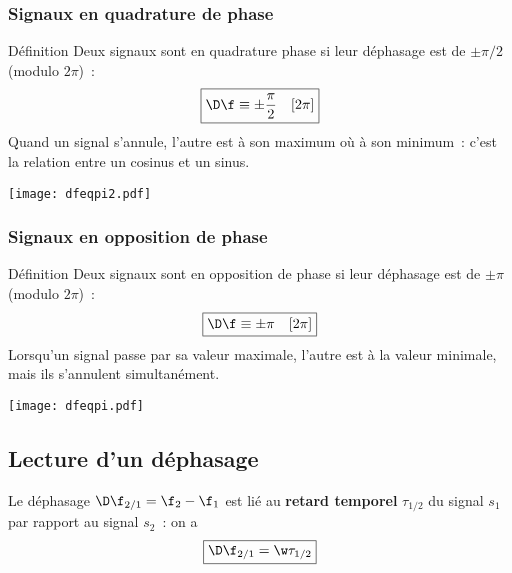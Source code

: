 \documentclass[../main/main.tex]{subfiles}
\begin{document}
\vspace{-20pt}
\subsubsection{Signaux en quadrature de phase}

\begin{minipage}{0.70\linewidth}
    \begin{rdefi}{\small Définition}
        Deux signaux sont en quadrature phase si leur déphasage est de
        $\pm\pi/2$ (modulo $2\pi$)~:
        \[\boxed{\D\f \equiv \pm\frac{\pi}{2} \quad[2\pi]}\]
        Quand un signal s'annule, l'autre est à son maximum où à son minimum~:
        c'est la relation entre un cosinus et un sinus.
    \end{rdefi}
\end{minipage}
\hfill
\begin{minipage}{0.30\linewidth}
    \begin{center}
        \texttt{[image: dfeqpi2.pdf]}
    \end{center}
\end{minipage}

\vspace{-20pt}
\subsubsection{Signaux en opposition de phase}

\begin{minipage}{0.70\linewidth}
    \begin{rdefi}{\small Définition}
        Deux signaux sont en opposition de phase si leur déphasage est de
        $\pm\pi$ (modulo $2\pi$)~:
        \[\boxed{\D\f \equiv \pm\pi \quad[2\pi]}\]
        Lorsqu'un signal passe par sa valeur maximale, l'autre est à la valeur
        minimale, mais ils s'annulent simultanément.
    \end{rdefi}
\end{minipage}
\hfill
\begin{minipage}{0.30\linewidth}
    \begin{center}
        \texttt{[image: dfeqpi.pdf]}
    \end{center}
\end{minipage}

\subsection{Lecture d'un déphasage}
Le déphasage $\D\f_{2/1} = \f_2 - \f_1$ est lié au \textbf{retard temporel}
$\tau_{1/2}$ du signal $s_1$ par rapport au signal $s_2$~: on a
\[\boxed{\D\f_{2/1} = \w\tau_{1/2}}\]
\end{document}
